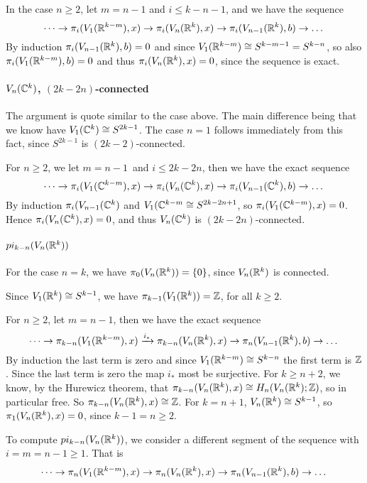 \documentclass[a4paper,11pt,english]{article}
\begin{document}
\begin{exercise}[1]
In the case $n \ge 2$, let $m = n-1$ and $i \le k-n-1$, and we have the sequence 
\[ \dots \to \pi_i(V_1(\mathbb{R}^{k-m}), x) \to \pi_i(V_n(\mathbb{R}^k), x) \to  \pi_i(V_{n-1}(\mathbb{R}^k),
b) \to \dots \]
By induction $\pi_i(V_{n-1}(\mathbb{R}^k), b) = 0$ and since $V_1(\mathbb{R}^{k-m}) \cong
S^{k-m-1} = S^{k-n}$, so also $\pi_i(V_1(\mathbb{R}^{k-m}), b) = 0$ and thus
$\pi_i(V_n(\mathbb{R}^k), x) = 0$, since the sequence is exact.


\paragraph{$V_n(\mathbb{C}^k)$, $(2k-2n)$-connected}
The argument is quote similar to the case above. The main difference being that
we know have $V_1(\mathbb{C}^k) \cong S^{2k-1}$. The case $n=1$ follows immediately from
this fact, since $S^{2k-1}$ is $(2k-2)$-connected.

For $n\ge 2$, we let $m=n-1$ and $i\le 2k-2n$, then we have the exact sequence
\[ \dots \to \pi_i(V_1(\mathbb{C}^{k-m}), x) \to \pi_i(V_n(\mathbb{C}^k), x) \to  \pi_i(V_{n-1}(\mathbb{C}^k),
b) \to \dots \]
By induction $\pi_i(V_{n-1}(\mathbb{C}^k)$ and $V_1(\mathbb{C}^{k-m} \cong S^{2k-2n+1}$, so
$\pi_i(V_1(\mathbb{C}^{k-m}), x) = 0$. Hence $\pi_i(V_n(\mathbb{C}^k), x) = 0$, and thus
$V_n(\mathbb{C}^k)$ is $(2k-2n)$-connected.


\paragraph{$pi_{k-n}(V_n(\mathbb{R}^k))$}
For the case $n = k$, we have $\pi_0(V_n(\mathbb{R}^{k})) = \{0\}$, since $V_n(\mathbb{R}^{k})$
is connected.


Since $V_1(\mathbb{R}^{k}) \cong S^{k-1}$, we have $\pi_{k-1}(V_1(\mathbb{R}^{k})) = \mathbb{Z}$, for
all $k \ge 2$. 

For $n \ge 2$, let $m = n-1$, then we have the exact sequence 
\[ \dots \to \pi_{k-n}(V_1(\mathbb{R}^{k-m}), x) \xrightarrow{i_*} \pi_{k-n}(V_n(\mathbb{R}^k), x) \to
\pi_n(V_{n-1}(\mathbb{R}^k),b) \to \dots \]
By induction the last term is zero and since $V_1(\mathbb{R}^{k-m}) \cong S^{k-n}$ the
first term is $\mathbb{Z}$. Since the last term is zero the map $i_*$ most be
surjective. For $k \ge n+2$, we know, by the Hurewicz theorem, that
$\pi_{k-n}(V_n(\mathbb{R}^k), x) \cong H_n(V_n(\mathbb{R}^k); \mathbb{Z})$, so in particular free. So
$\pi_{k-n}(V_n(\mathbb{R}^k), x) \cong \mathbb{Z}$. For $k = n+1$, $V_n(\mathbb{R}^k) \cong S^{k-1}$, so 
$\pi_1(V_n(\mathbb{R}^k), x) = 0$, since $k-1 = n \ge 2$.







To compute $pi_{k-n}(V_n(\mathbb{R}^k))$, we consider a different segment of the
sequence with $i = m = n-1 \ge 1$. That is 
\[ \dots \to \pi_n(V_1(\mathbb{R}^{k-m}), x) \to \pi_n(V_n(\mathbb{R}^k), x) \to  \pi_n(V_{n-1}(\mathbb{R}^k),
b) \to \dots \]










\end{exercise}
\end{document}
